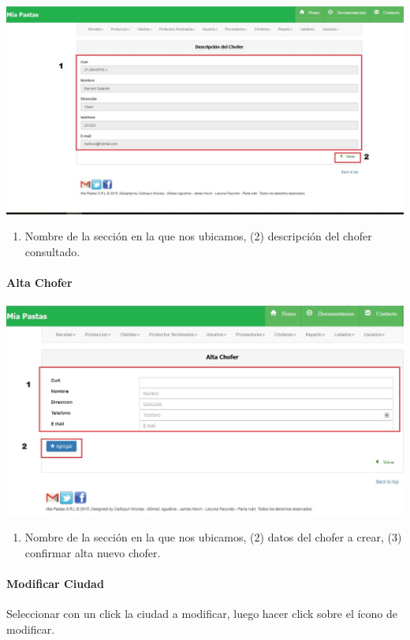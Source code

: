 \documentclass[letterpaper,10pt,english]{sphinxmanual}
\begin{document}
\includegraphics{chofer_detalle.jpg}
\begin{enumerate}
\item {} 
Nombre de la sección en la que nos ubicamos, (2) descripción del chofer consultado.

\end{enumerate}


\paragraph{{}Alta Chofer}
\label{choferes alta:alta-chofer}\label{choferes alta::doc}
\includegraphics{chofer_alta.jpg}
\begin{enumerate}
\item {} 
Nombre de la sección en la que nos ubicamos, (2) datos del chofer a crear, (3) confirmar alta nuevo chofer.

\end{enumerate}


\paragraph{{}Modificar Ciudad}
\label{choferes modificar:modificar-ciudad}\label{choferes modificar::doc}
Seleccionar con un click la ciudad a modificar, luego hacer click sobre el ícono de modificar.
\end{document}
